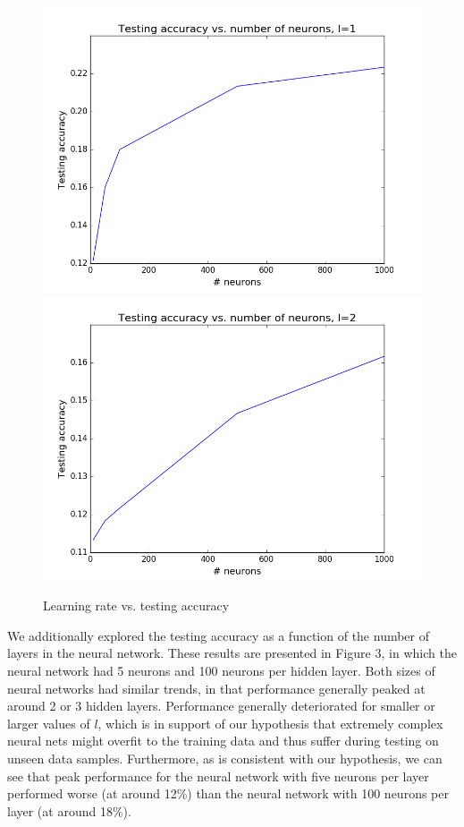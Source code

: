 \documentclass{article}
\begin{document}
\begin{figure}[width=\linewidth]
\centering
\begin{multicols}{2}
  \includegraphics[width=1.2\linewidth]{code/P1/accuracy_vs_neurons,mnist.png}
  \includegraphics[width=1.2\linewidth]{code/P1/accuracy_vs_neurons,mnist,l2.png}
\end{multicols}
\caption{Learning rate vs. testing accuracy}
\end{figure}

We additionally explored the testing accuracy as a function of the number of layers in the neural network. These results are presented in Figure 3, in which the neural network had 5 neurons and 100 neurons per hidden layer. Both sizes of neural networks had similar trends, in that performance generally peaked at around 2 or 3 hidden layers. Performance generally deteriorated for smaller or larger values of $l$, which is in support of our hypothesis that extremely complex neural nets might overfit to the training data and thus suffer during testing on unseen data samples. Furthermore, as is consistent with our hypothesis, we can see that peak performance for the neural network with five neurons per layer performed worse (at around 12\%) than the neural network with 100 neurons per layer (at around 18\%).
\end{document}
